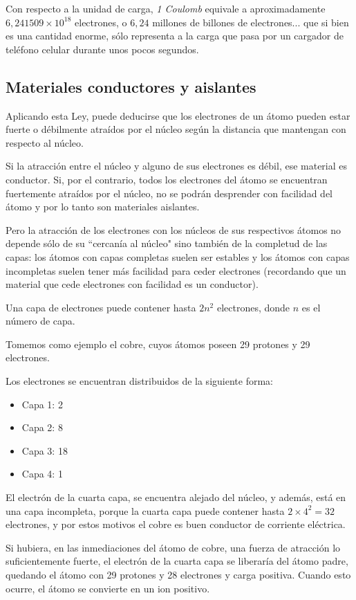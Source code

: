 Con respecto a la unidad de carga, \textit{1 Coulomb} equivale a aproximadamente $6,241509\times 10^{18}$ electrones, o $6,24$ millones de billones de electrones... que si bien es una cantidad enorme, sólo representa a la carga que pasa por un cargador de teléfono celular durante unos pocos segundos.

\subsection{Materiales conductores y aislantes}

Aplicando esta Ley, puede deducirse que los electrones de un átomo pueden estar fuerte o débilmente atraídos por el núcleo según la distancia que mantengan con respecto al núcleo.

Si la atracción entre el núcleo y alguno de sus electrones es débil, ese material es conductor. Si, por el contrario, todos los electrones del átomo se encuentran fuertemente atraídos por el núcleo, no se podrán desprender con facilidad del átomo y por lo tanto son materiales aislantes.

Pero la atracción de los electrones con los núcleos de sus respectivos átomos no depende sólo de su ``cercanía al núcleo" sino también de la completud de las capas: los átomos con capas completas suelen ser estables y los átomos con capas incompletas suelen tener más facilidad para ceder electrones (recordando que un material que cede electrones con facilidad es un conductor).

Una capa de electrones puede contener hasta $2n^{2}$ electrones, donde $n$ es el número de capa.

Tomemos como ejemplo el cobre, cuyos átomos poseen 29 protones y 29 electrones.

Los electrones se encuentran distribuidos de la siguiente forma:
\begin{itemize}
	\item Capa 1: 2
	\item Capa 2: 8
	\item Capa 3: 18
	\item Capa 4: 1
\end{itemize}

El electrón de la cuarta capa, se encuentra alejado del núcleo, y además, está en una capa incompleta, porque la cuarta capa puede contener hasta $2\times 4^{2}=32$ electrones, y por estos motivos el cobre es buen conductor de corriente eléctrica.

Si hubiera, en las inmediaciones del átomo de cobre, una fuerza de atracción lo suficientemente fuerte, el electrón de la cuarta capa se liberaría del átomo padre, quedando el átomo con 29 protones y 28 electrones y carga positiva. Cuando esto ocurre, el átomo se convierte en un ion positivo.

